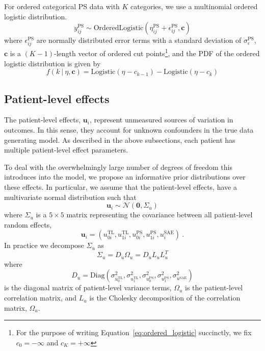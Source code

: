 \documentclass[twocolumn]{bmcart}%
\def\v#1{\bm{#1}}
\newcommand{\norm}{\ensuremath{\mathcal{N}}}
\newcommand{\tl}{\ensuremath{\text{TL}}}
\newcommand{\ps}{\ensuremath{\text{PS}}}
\newcommand{\sae}{\ensuremath{\text{SAE}}}
\begin{document}
For ordered categorical PS data with $K$ categories, we use a multinomial ordered logistic distribution.
\begin{equation}
  \label{eq:ps_categorical}
  y^\ps_{ij} \sim \text{OrderedLogistic}(\eta^\ps_{ij} + \epsilon_{ij}^\ps, \v c)
\end{equation}
where
$\epsilon_{ij}^\ps$ are normally distributed error terms with a standard deviation of $\sigma_\epsilon^\ps$, $\v c$ is a $(K - 1)$-length vector of ordered cut points\footnote{For the purpose of writing Equation~\ref{eq:ordered_logistic} succinctly, we fix $c_0 = -\infty$ and $c_K = +\infty$}, and the PDF of the ordered logistic distribution is given by
\begin{equation}
  \label{eq:ordered_logistic}
  f(k \ | \ \eta, \v c) =  \text{Logistic}(\eta - c_{k - 1})  - \text{Logistic}(\eta - c_k)
\end{equation}

\subsection{Patient-level effects}\label{model-patient_level}

The patient-level effects, $\v u_i$, represent unmeasured sources of variation in outcomes.
In this sense, they account for unknown confounders in the true data generating model.
As described in the above subsections, each patient has multiple patient-level effect parameters.

To deal with the overwhelmingly large number of degrees of freedom this introduces into the model, we propose an informative prior distributions over these effects.
In particular, we assume that the patient-level effects, have a multivariate normal distribution such that
\begin{equation}
  \label{eq:patient_effects_prior}
  \v{u}_i \sim \norm(\v 0, \Sigma_u)
\end{equation}
where $\Sigma_u$ is a $5 \times 5$ matrix representing the covariance between all patient-level random effects, 
\begin{equation}
  \label{eq:patient_effects}
  \v u_i = (u_{0i}^\tl, u_{1i}^\tl, u_{0i}^\ps, u_{1i}^\ps, u_{i}^\sae) \ .
\end{equation}
In practice we decompose $\Sigma_u$ as
\begin{equation}
  \label{eq:patient_effects_decomposition}
  \Sigma_u = D_u \Omega_u = D_u L_u L_u^T
\end{equation}
where
\begin{equation}
  \label{eq:patient_effects_diagonal}
  D_u = \text{Diag}(\sigma^2_{u_0^\tl}, \sigma^2_{u_1^\tl}, \sigma^2_{u_0^\ps}, \sigma^2_{u_1^\ps}, \sigma^2_{u^\sae})
\end{equation}
is the diagonal matrix of patient-level variance terms, $\Omega_u$ is the patient-level correlation matrix, and $L_u$ is the Cholesky decomposition of the correlation matrix, $\Omega_u$.
\end{document}

